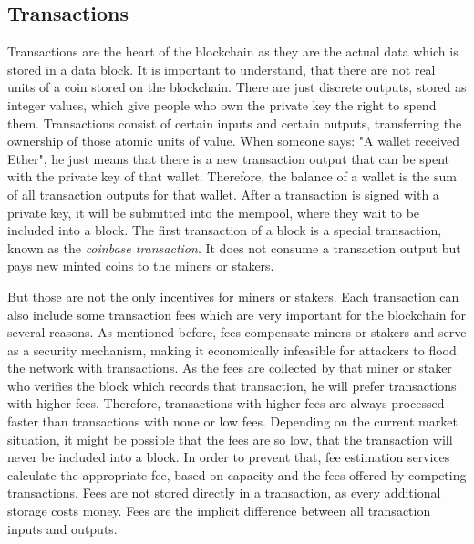 \subsection{Transactions}
Transactions are the heart of the blockchain as they are the actual data which is stored in a data block. It is important to understand, that there are not real
units of a coin stored on the blockchain. There are just discrete outputs, stored as integer values, which give people who own the private key the right to spend
them. Transactions consist of certain inputs and certain outputs, transferring the ownership of those atomic units of value. When someone says: "A wallet received
Ether", he just means that there is a new transaction output that can be spent with the private key of that wallet. Therefore, the balance of a wallet is the sum of
all transaction outputs for that wallet. After a transaction is signed with a private key, it will be submitted into the mempool, where they wait to be included into
a block. The first transaction of a block is a special transaction, known as the \textit{coinbase transaction}. It does not consume a transaction output but pays new minted coins to the miners or stakers.

But those are not the only incentives for miners or stakers. Each transaction can also include some transaction fees which are very important
for the blockchain for several reasons. As mentioned before, fees compensate miners or stakers and serve as a security mechanism, making it economically infeasible for attackers
to flood the network with transactions. As the fees are collected by that miner or staker who verifies the block which records that transaction, he will prefer transactions with
higher fees. Therefore, transactions with higher fees are always processed faster than transactions with none or low fees. Depending on the current market situation,
it might be possible that the fees are so low, that the transaction will never be included into a block. In order to prevent that, fee estimation services calculate
the appropriate fee, based on capacity and the fees offered by competing transactions. Fees are not stored directly in a transaction, as every additional storage
costs money. Fees are the implicit difference between all transaction inputs and outputs.

